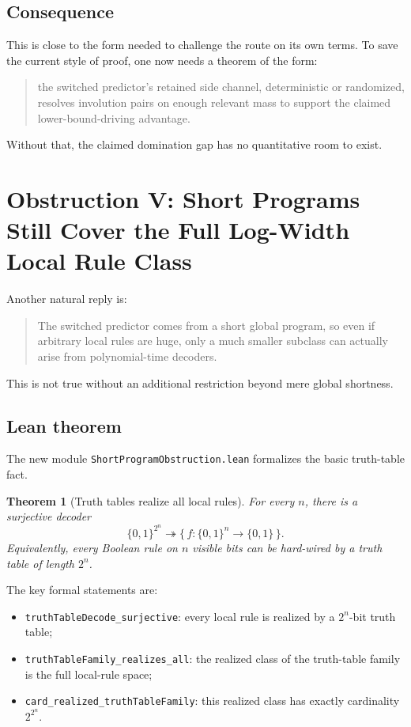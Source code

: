 \documentclass[11pt]{article}
\newtheorem{theorem}{Theorem}[section]
\theoremstyle{remark}
\begin{document}
\subsection{Consequence}

This is close to the form needed to challenge the route on its own terms.  To save the current
style of proof, one now needs a theorem of the form:
\begin{quote}
the switched predictor's retained side channel, deterministic or randomized, resolves involution
pairs on enough relevant mass to support the claimed lower-bound-driving advantage.
\end{quote}

Without that, the claimed domination gap has no quantitative room to exist.

\section{Obstruction V: Short Programs Still Cover the Full Log-Width Local Rule Class}

Another natural reply is:
\begin{quote}
The switched predictor comes from a short global program, so even if arbitrary local rules are
huge, only a much smaller subclass can actually arise from polynomial-time decoders.
\end{quote}

This is not true without an additional restriction beyond mere global shortness.

\subsection{Lean theorem}

The new module \texttt{ShortProgramObstruction.lean} formalizes the basic truth-table fact.

\begin{theorem}[Truth tables realize all local rules]
For every \(n\), there is a surjective decoder
\[
  \{0,1\}^{2^n} \twoheadrightarrow \{\,f : \{0,1\}^n \to \{0,1\}\,\}.
\]
Equivalently, every Boolean rule on \(n\) visible bits can be hard-wired by a truth table of
length \(2^n\).
\end{theorem}

\noindent
The key formal statements are:
\begin{itemize}[leftmargin=1.5em]
  \item \texttt{truthTableDecode\_surjective}: every local rule is realized by a
  \(2^n\)-bit truth table;
  \item \texttt{truthTableFamily\_realizes\_all}: the realized class of the truth-table family is
  the full local-rule space;
  \item \texttt{card\_realized\_truthTableFamily}: this realized class has exactly cardinality
  \(2^{2^n}\).
\end{itemize}
\end{document}
